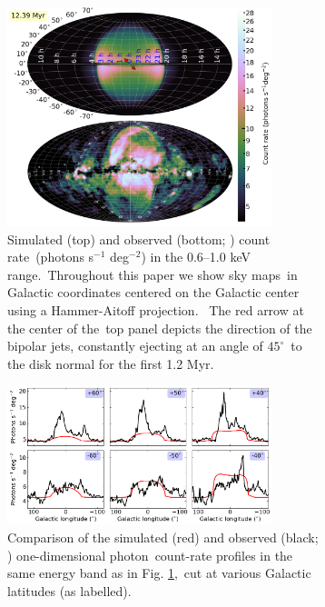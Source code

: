 \documentclass[fleqn,usenatbib,useAMS]{mnras}
\begin{document}
 \begin{figure}%
      \begin{subfigure}[t]{\textwidth}%
         \centering%
         \includegraphics[width=0.85\textwidth]{figures/fig__xraymap.png}%
         \caption{
               Simulated (top) and observed (bottom; \citealt{Predehl2020}) count rate\
               (photons s$^{-1}$ deg$^{-2}$) in the 0.6--1.0 keV range.\
               Throughout this paper we show sky maps\
               in Galactic coordinates centered on the Galactic center using a Hammer-Aitoff projection.\
               The red arrow at the center of the\
               top panel depicts the direction of the bipolar jets, constantly ejecting at an angle of $45^{\circ}$\
               to the disk normal for the first 1.2 Myr.
         }%
         \label{fig__xray_0.8keV_angle_000}%
         \end{subfigure}%
         \hspace{4pt}%
      \begin{subfigure}[t]{\textwidth}%
         \centering%
         \includegraphics[width=0.85\textwidth]{figures/fig__xray-profile-0.8keV-000.png}%
         \caption{
               Comparison of the simulated (red) and observed (black; \citealt{Predehl2020}) one-dimensional photon\
               count-rate profiles in the same energy band as in Fig. \ref{fig__xray_0.8keV_angle_000},\
               cut at various Galactic latitudes (as labelled).
         }%
         \label{fig__x-ray-profile-0.8keV-000}%
      \end{subfigure}%
      \caption{}%
      \label{fig_xray-map}
 \end{figure}%
\end{document}

